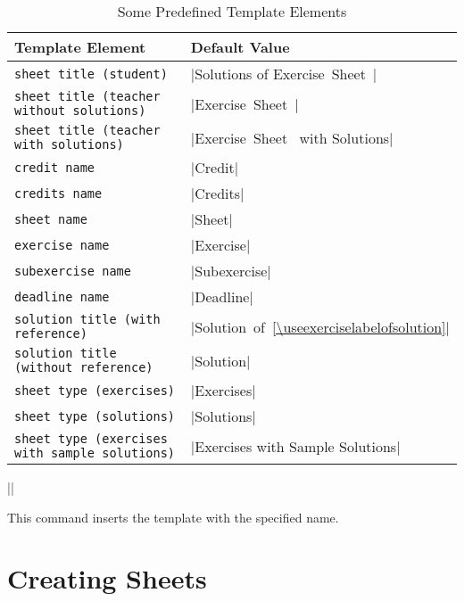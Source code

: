 \documentclass[a4paper,fleqn]{report}
\def\sheettemplatekey#1{\lstinline[language={}]{#1}}
\def\syntaxdefaultarg#1{\hfill\texttt{\small #1}\par\smallskip\noindent\ignorespaces}
\def\metaargument#1{\textit{\small #1}}
\begin{document}
\begin{table}[htbp]
  \caption{Some Predefined Template Elements}
  \label{table:template elements}
  \centering
  \bigskip
  \begin{tabular}{lp{}}
    Template Element & Default Value \\ \midrule
    \sheettemplatekey{sheet title (student)} & 
      |Solutions of Exercise~Sheet~\thesheet{}| \\
    \sheettemplatekey{sheet title (teacher without solutions)} & 
      |Exercise~Sheet~\thesheet{}| \\
    \sheettemplatekey{sheet title (teacher with solutions)} & 
      |Exercise~Sheet~\thesheet{} with Solutions| \\
    \sheettemplatekey{credit name} & 
      |Credit| \\
    \sheettemplatekey{credits name} & 
      |Credits| \\
    \sheettemplatekey{sheet name} & 
      |Sheet| \\
    \sheettemplatekey{exercise name} & 
      |Exercise| \\
    \sheettemplatekey{subexercise name} & 
      |Subexercise| \\
    \sheettemplatekey{deadline name} & 
      |Deadline| \\
    \sheettemplatekey{solution title (with reference)} &
      |Solution~of~\ref{\useexerciselabelofsolution}| \\
    \sheettemplatekey{solution title (without reference)} & 
      |Solution| \\
    \sheettemplatekey{sheet type (exercises)} &
      |Exercises| \\
    \sheettemplatekey{sheet type (solutions)} &
      |Solutions| \\
    \sheettemplatekey{sheet type (exercises with sample solutions)} &
      |Exercises with Sample Solutions| \\
  \end{tabular}
\end{table}

\begin{syntax}
  |\usesheettemplate{|\metaargument{template name}|}|
  \syntaxdefaultarg{}
  This command inserts the template with the specified name.
\end{syntax}

\section{Creating Sheets}
\end{document}
